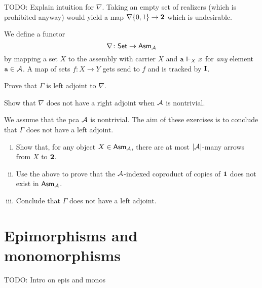 \textcolor{Mulberry}{TODO: Explain intuition for \(\nabla\). Taking an empty set
  of realizers (which is prohibited anyway) would yield a map
  \(\nabla\set{0,1} \to \Two\) which is undesirable.}
\begin{definition}[\(\nabla\)]
  We define a functor
  \[
    \nabla \colon \Set \to \Asm{\AA}
  \]
  by mapping a set \(X\) to the assembly with carrier \(X\) and
  \(\pca{a} \realizes_X x\) for \emph{any} element \(\pca{a} \in \AA\).
  A map of sets \(f \colon X \to Y\) gets send to \(f\) and is tracked by
  \(\icomb\).
\end{definition}


\begin{exercise}\label{exer:Gamma-left-adjoint-to-nabla}
  Prove that \(\Gamma\) is left adjoint to \(\nabla\).
\end{exercise}

\begin{exercise}\label{exer:nabla-no-right-adjoint}
  Show that \(\nabla\) does not have a right adjoint when \(\AA\) is nontrivial.

\end{exercise}

\begin{exercise}\label{exer:Gamma-no-left-adjoint}
  We assume that the pca \(\AA\) is nontrivial. The aim of these exercises is to
  conclude that \(\Gamma\) does not have a left adjoint.
  \begin{enumerate}[(i)]
  \item Show that, for any object \(X \in \Asm{\AA}\), there are at most
    \(\carrier{\AA}\)-many arrows from \(X\) to \(\Two\).
  \item Use the above to prove that the \(\AA\)-indexed coproduct of copies of
    \(\One\) does not exist in \(\Asm{\AA}\).
  \item Conclude that \(\Gamma\) does not have a left adjoint.
  \end{enumerate}
\end{exercise}

\section{Epimorphisms and monomorphisms}
\textcolor{Mulberry}{TODO: Intro on epis and monos}

